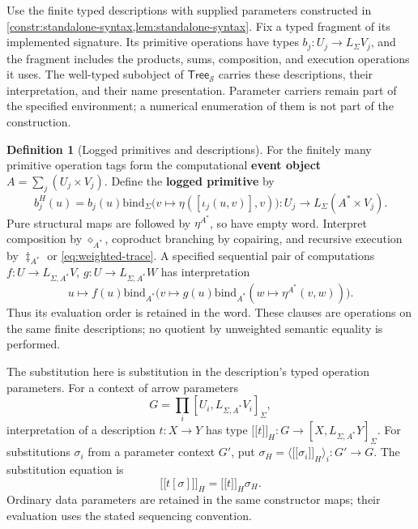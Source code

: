 \documentclass[11pt,a4paper]{article}
\numberwithin{algorithm}{section}
\numberwithin{equation}{section}
\theoremstyle{definition}
\newtheorem{definition}[definition]{Definition}
\theoremstyle{remark}
\theoremstyle{plain}
\newcommand{\LL}{L_{\Sigma}}
\newcommand{\llbracket}{\mathopen{[\![}}
\newcommand{\rrbracket}{\mathclose{]\!]}}
\newcommand{\bind}{\mathbin{\mathrm{bind}}}
\theoremstyle{definition}
\theoremstyle{plain}
\begin{document}
Use the finite typed descriptions with supplied parameters
constructed in \cref{constr:standalone-syntax,lem:standalone-syntax}.
Fix a typed fragment of its implemented signature. Its primitive
operations have types $b_j:U_j\to\LL V_j$, and the fragment includes
the products, sums, composition, and execution operations it uses.
The well-typed subobject of $\mathsf{Tree}_{\mathcal S}$ carries
these descriptions, their interpretation, and their name presentation.
Parameter carriers remain part of the specified environment; a numerical enumeration
of them is not part of the construction.


\begin{definition}[Logged primitives and descriptions]\label{def:logged-descriptions}
For the finitely many primitive operation tags form the computational
\textbf{event object} $A=\sum_j(U_j\times V_j)$. Define the \textbf{logged primitive} by
\[
 b_j^H(u)=b_j(u)\bind_\Sigma
       \bigl(v\mapsto\eta([\iota_j(u,v)],v)\bigr)
       :U_j\to\LL(A^*\times V_j).
\]
Pure structural maps are followed by $\eta^{A^*}$, so have empty word.
Interpret composition by $\diamond_{A^*}$, coproduct branching by
copairing, and recursive execution by $\ddagger_{A^*}$ or
\eqref{eq:weighted-trace}. A specified sequential pair of computations
$f:U\to L_{\Sigma,A^*}V$, $g:U\to L_{\Sigma,A^*}W$ has interpretation
\[
 u\mapsto f(u)\bind_{A^*}
       \bigl(v\mapsto g(u)\bind_{A^*}(w\mapsto\eta^{A^*}(v,w))\bigr).
\]
Thus its evaluation order is retained in the word. These clauses are
operations on the same finite descriptions; no quotient by unweighted
semantic equality is performed.
\end{definition}


The substitution here is substitution in the description's typed
operation parameters. For a context of arrow parameters
\[
 G=\prod_i[U_i,L_{\Sigma,A^*}V_i]_\Sigma,
\]
interpretation of a description $t:X\to Y$ has type
$\llbracket t\rrbracket_H:G\to[X,L_{\Sigma,A^*}Y]_\Sigma$.
For substitutions $\sigma_i$ from a parameter context $G'$, put
$\sigma_H=\langle\llbracket\sigma_i\rrbracket_H\rangle_i:G'\to G$.
The substitution equation is
\[
 \llbracket t[\sigma]\rrbracket_H
 =\llbracket t\rrbracket_H\sigma_H.
\]
Ordinary data parameters are retained in the same constructor maps;
their evaluation uses the stated sequencing convention.
\end{document}
